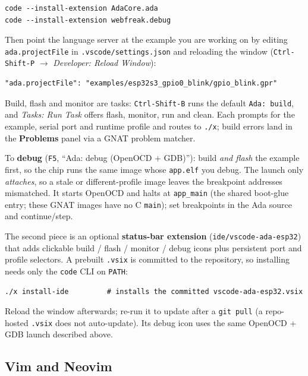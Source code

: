 \begin{lstlisting}[style=sh]
code --install-extension AdaCore.ada
code --install-extension webfreak.debug
\end{lstlisting}

Then point the language server at the example you are working on by editing
\texttt{ada.projectFile} in \texttt{.vscode/settings.json} and reloading the
window (\texttt{Ctrl-Shift-P} $\rightarrow$ \emph{Developer: Reload Window}):

\begin{lstlisting}[style=sh]
"ada.projectFile": "examples/esp32s3_gpio0_blink/gpio_blink.gpr"
\end{lstlisting}

Build, flash and monitor are tasks: \texttt{Ctrl-Shift-B} runs the default
\texttt{Ada: build}, and \emph{Tasks: Run Task} offers flash, monitor, run and
clean. Each prompts for the example, serial port and runtime profile and routes
to \texttt{./x}; build errors land in the \textbf{Problems} panel via a GNAT
problem matcher.

To \textbf{debug} (\texttt{F5}, ``Ada: debug (OpenOCD + GDB)''): build \emph{and
flash} the example first, so the chip runs the same image whose \texttt{app.elf}
you debug. The launch only \emph{attaches}, so a stale or different-profile
image leaves the breakpoint addresses mismatched. It starts OpenOCD and halts at
\texttt{app\_main} (the shared boot-glue entry; these GNAT images have no C
\texttt{main}); set breakpoints in the Ada source and continue/step.

The second piece is an optional \textbf{status-bar extension}
(\texttt{ide/vscode-ada-esp32}) that adds clickable build / flash / monitor /
debug icons plus persistent port and profile selectors. A prebuilt
\texttt{.vsix} is committed to the repository, so installing needs only the
\texttt{code} CLI on \texttt{PATH}:

\begin{lstlisting}[style=sh]
./x install-ide         # installs the committed vscode-ada-esp32.vsix
\end{lstlisting}

Reload the window afterwards; re-run it to update after a \texttt{git pull} (a
repo-hosted \texttt{.vsix} does not auto-update). Its debug icon uses the same
OpenOCD + GDB launch described above.

\subsection{Vim and Neovim}

